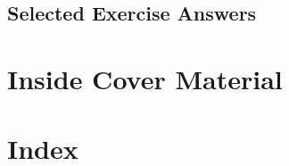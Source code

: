 \begin{enumialphparenastyle}
\chapter*{Selected Exercise Answers}
	
\end{enumialphparenastyle}

\chapter*{Inside Cover Material}


\chapter*{Index}
\printindex